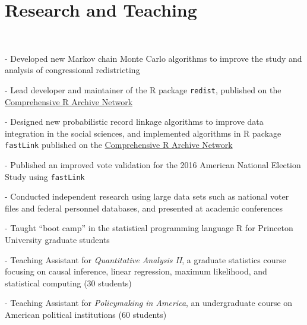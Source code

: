 \documentclass[]{deedy-resume-openfont}
\begin{document}
\begin{minipage}[t]{0.66\textwidth}

\section{Research and Teaching}
\\
\begin{tightemize}
\item[-] Developed new Markov chain Monte Carlo algorithms to improve the study and analysis of congressional redistricting
\item[-] Lead developer and maintainer of the R package \texttt{redist}, published on the \href{http://cran.r-project.org/web/packages/redist/}{Comprehensive R Archive Network}
\item[-] Designed new probabilistic record linkage algorithms to improve data integration in the social sciences, and implemented algorithms in R package \texttt{fastLink} published on the \href{http://cran.r-project.org/web/packages/fastLink/}{Comprehensive R Archive Network}
\item[-] Published an improved vote validation for the 2016 American National Election Study using \texttt{fastLink}
\item[-] Conducted independent research using large data sets such as national voter files and federal personnel databases, and presented at academic conferences
\end{tightemize}
\sectionsep

\begin{tightemize}
\item[-] Taught ``boot camp'' in the statistical programming language R for Princeton University graduate students
\item[-] Teaching Assistant for \textit{Quantitative Analysis II}, a graduate statistics course focusing on causal inference, linear regression, maximum likelihood, and statistical computing (30 students)
\item[-] Teaching Assistant for \textit{Policymaking in America}, an undergraduate course on American political institutions (60 students)
\end{tightemize}

\end{minipage} 
\end{document}
